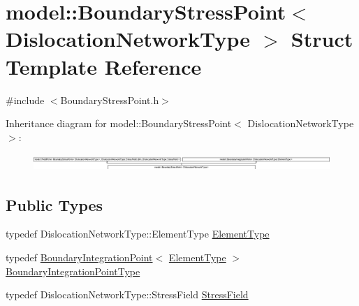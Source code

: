 \hypertarget{structmodel_1_1_boundary_stress_point}{}\section{model\+:\+:Boundary\+Stress\+Point$<$ Dislocation\+Network\+Type $>$ Struct Template Reference}
\label{structmodel_1_1_boundary_stress_point}


{\ttfamily \#include $<$Boundary\+Stress\+Point.\+h$>$}

Inheritance diagram for model\+:\+:Boundary\+Stress\+Point$<$ Dislocation\+Network\+Type $>$\+:\begin{figure}[H]
\begin{center}
\leavevmode
\includegraphics[height=0.643678cm]{structmodel_1_1_boundary_stress_point}
\end{center}
\end{figure}
\subsection*{Public Types}
\begin{DoxyCompactItemize}
\item 
typedef Dislocation\+Network\+Type\+::\+Element\+Type \hyperlink{structmodel_1_1_boundary_stress_point_abbe62ae453e93d99f80b043f4de9bf04}{Element\+Type}
\item 
typedef \hyperlink{structmodel_1_1_boundary_integration_point}{Boundary\+Integration\+Point}$<$ \hyperlink{structmodel_1_1_boundary_stress_point_abbe62ae453e93d99f80b043f4de9bf04}{Element\+Type} $>$ \hyperlink{structmodel_1_1_boundary_stress_point_a8e4470be4cf3e1bf6b903a300a9d5734}{Boundary\+Integration\+Point\+Type}
\item 
typedef Dislocation\+Network\+Type\+::\+Stress\+Field \hyperlink{structmodel_1_1_boundary_stress_point_a0a32689c2130c3a3729817e775a96751}{Stress\+Field}
\end{DoxyCompactItemize}
